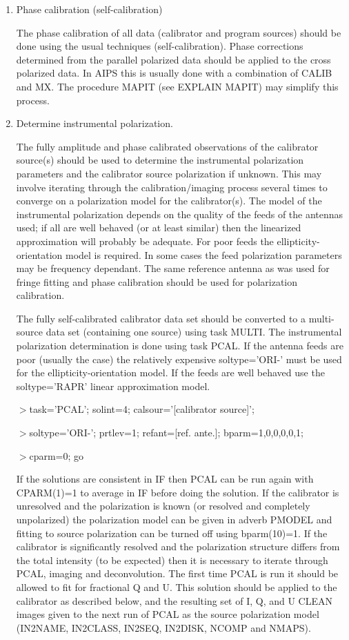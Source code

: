 \begin{enumerate}
\item Phase calibration (self-calibration)

   The phase calibration of all data (calibrator and program sources)
should be done using the usual techniques (self-calibration).  Phase
corrections determined from the parallel polarized data should be
applied to the cross polarized data.  In AIPS this is usually done
with a combination of CALIB and MX.  The procedure MAPIT (see EXPLAIN
MAPIT) may simplify this process.

\item Determine instrumental polarization.

   The fully amplitude and phase calibrated observations of the
calibrator source(s) should be used to determine the instrumental
polarization parameters and the calibrator source polarization if
unknown.  This may involve iterating through the calibration/imaging
process several times to converge on a polarization model for the
calibrator(s).  The model of the instrumental polarization depends on
the quality of the feeds of the antennas used; if all are well behaved
(or at least similar) then the linearized approximation will probably
be adequate.  For poor feeds the ellipticity-orientation model is
required.  In some cases the feed polarization parameters may be
frequency dependant.  The same reference antenna as was used for
fringe fitting and phase calibration should be used for polarization
calibration.

   The fully self-calibrated calibrator data set should be converted
to a multi-source data set (containing one source) using task MULTI.
The instrumental polarization determination is done using task
PCAL.  If the antenna feeds are poor (usually the case) the relatively
expensive soltype='ORI-' must be used for the ellipticity-orientation
model.  If the feeds are well behaved use the soltype='RAPR' linear
approximation model.
\par\noindent
$>$task='PCAL'; solint=4; calsour='[calibrator source]';
\par\noindent
$>$soltype='ORI-'; prtlev=1; refant=[ref. ante.]; bparm=1,0,0,0,0,1;
\par\noindent
$>$cparm=0; go

   If the solutions are consistent in IF then PCAL can be run again
with CPARM(1)=1 to average in IF before doing the solution.  If the
calibrator is unresolved and the polarization is known (or resolved
and completely unpolarized) the polarization model can be given in
adverb PMODEL and fitting to source polarization can be turned off
using bparm(10)=1.
   If the calibrator is significantly resolved and the polarization
structure differs from the total intensity (to be expected) then it is
necessary to iterate through PCAL, imaging and deconvolution.  The
first time PCAL is run it should be allowed to fit for fractional Q
and U.  This solution should be applied to the calibrator as described
below, and the resulting set of I, Q, and U CLEAN images given to the
next run of PCAL as the source polarization model (IN2NAME, IN2CLASS,
IN2SEQ, IN2DISK, NCOMP and NMAPS).


\end{enumerate}
